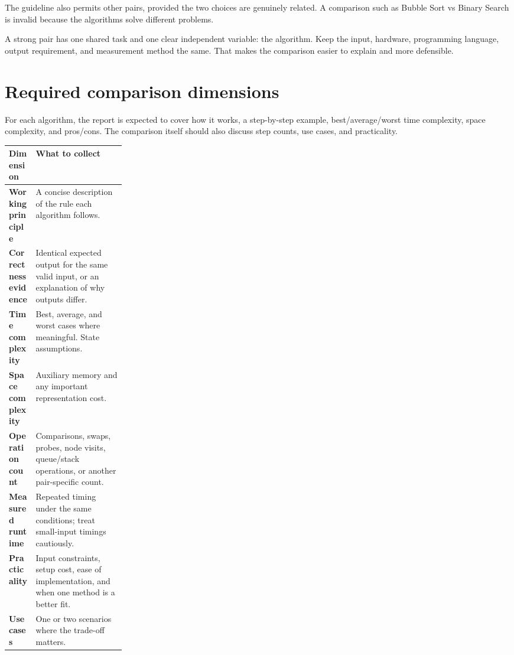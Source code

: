 The guideline also permits other pairs, provided the two choices are genuinely related. A comparison such as Bubble Sort vs Binary Search is invalid because the algorithms solve different problems.

\begin{recommendedworkflow}
A strong pair has one shared task and one clear independent variable: the algorithm. Keep the input, hardware, programming language, output requirement, and measurement method the same. That makes the comparison easier to explain and more defensible.
\end{recommendedworkflow}

\section{Required comparison dimensions}

For each algorithm, the report is expected to cover how it works, a step-by-step example, best/average/worst time complexity, space complexity, and pros/cons. The comparison itself should also discuss step counts, use cases, and practicality.

\begin{mltable}
\begin{tabularx}{\linewidth}{@{}>{\bfseries\leavevmode\color{ADSNavy}}p{0.23\linewidth}X@{}}
\toprule
\rowcolor{ADSPaleBlue!92}
Dimension & What to collect \\
\midrule
Working principle & A concise description of the rule each algorithm follows. \\
Correctness evidence & Identical expected output for the same valid input, or an explanation of why outputs differ. \\
Time complexity & Best, average, and worst cases where meaningful. State assumptions. \\
Space complexity & Auxiliary memory and any important representation cost. \\
Operation count & Comparisons, swaps, probes, node visits, queue/stack operations, or another pair-specific count. \\
Measured runtime & Repeated timing under the same conditions; treat small-input timings cautiously. \\
Practicality & Input constraints, setup cost, ease of implementation, and when one method is a better fit. \\
Use cases & One or two scenarios where the trade-off matters. \\
\bottomrule
\end{tabularx}
\end{mltable}

